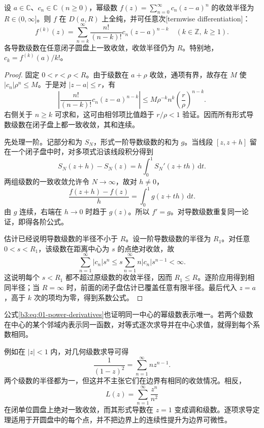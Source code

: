 \begin{theorem}\label{b3:thm:01-power-differentiation}
设 \(a\in\mathbb C\)、\(c_n\in\mathbb C\ (n\ge0)\)，幂级数 \(f(z)=\sum_{n=0}^\infty c_n(z-a)^n\) 的收敛半径为 \(R\in(0,\infty]\)。则 \(f\) 在 \(D(a,R)\) 上全纯，并可任意次[termwise differentiation]：
\begin{equation}\label{b3:eq:01-power-derivatives}
f^{(k)}(z)=\sum_{n=k}^\infty\frac{n!}{(n-k)!}c_n(z-a)^{n-k}
\quad(k\in\mathbb Z,\ k\geq1).
\end{equation}
各导数级数在任意闭子圆盘上一致收敛，收敛半径仍为 \(R\)。特别地，\(c_k=f^{(k)}(a)/k!\)。
\end{theorem}
\begin{proof}
固定 \(0<r<\rho<R\)。由于级数在 \(a+\rho\) 收敛，通项有界，故存在 \(M\) 使 \(|c_n|\rho^n\leq M\)。于是对 \(|z-a|\leq r\)，有
\[
\left|\frac{n!}{(n-k)!}c_n(z-a)^{n-k}\right|
\leq M\rho^{-k}n^k\left(\frac r\rho\right)^{n-k}.
\]
右侧关于 \(n\geq k\) 可求和，这可由相邻项比值趋于 \(r/\rho<1\) 验证。因而所有形式导数级数在闭子盘上都一致收敛，其和连续。

先处理一阶。记部分和为 \(S_N\)，形式一阶导数级数的和为 \(g\)。当线段 \([z,z+h]\) 留在一个闭子盘中时，对多项式沿该线段积分得到
\[
S_N(z+h)-S_N(z)=h\int_0^1 S_N'(z+th)\,\mathrm{d}t.
\]
两组级数的一致收敛允许令 \(N\to\infty\)，故对 \(h\neq0\)，
\[
\frac{f(z+h)-f(z)}h=\int_0^1g(z+th)\,\mathrm{d}t.
\]
由 \(g\) 连续，右端在 \(h\to0\) 时趋于 \(g(z)\)。所以 \(f'=g\)。对导数级数重复同一论证，即得各阶公式。

估计已经说明导数级数的半径不小于 \(R\)。设一阶导数级数的半径为 \(R_1\)。对任意 \(0<s<R_1\)，该级数在距离中心为 \(s\) 的点绝对收敛，故
\[
\sum_{n=1}^\infty|c_n|s^n
\leq s\sum_{n=1}^\infty n|c_n|s^{n-1}<\infty.
\]
这说明每个 \(s<R_1\) 都不超过原级数的收敛半径，因而 \(R_1\le R\)。逐阶应用得到相同半径；当 \(R=\infty\) 时，前面的闭子盘估计已覆盖任意有限半径。最后代入 \(z=a\)，高于 \(k\) 次的项均为零，得到系数公式。
\end{proof}

公式\eqref{b3:eq:01-power-derivatives}也证明同一中心的幂级数表示唯一。若两个级数在中心的某个邻域内表示同一函数，对等式逐次求导并在中心求值，就得到每个系数相同。

\ProseParagraphBreak

例如在 \(|z|<1\) 内，对几何级数求导可得
\[
 \frac1{(1-z)^2}=\sum_{n=1}^{\infty}nz^{n-1}.
\]
两个级数的半径都为一，但这并不主张它们在边界有相同的收敛情况。相反，
\[
 L(z)=\sum_{n=1}^{\infty}\frac{z^n}{n^2}
\]
在闭单位圆盘上绝对一致收敛，而其形式导数在 \(z=1\) 变成调和级数。逐项求导定理适用于开圆盘中的每个点，并不把边界上的连续性提升为边界可微性。

